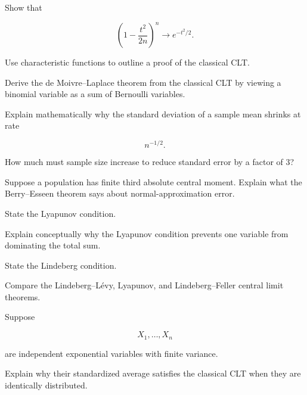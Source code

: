 \begin{exercise}[3]
Show that

\[
\left(
1-\frac{t^2}{2n}
\right)^n
\to
e^{-t^2/2}.
\]
\end{exercise}

\begin{exercise}[3]
Use characteristic functions to outline a proof of the classical CLT.
\end{exercise}

\begin{exercise}[3]
Derive the de Moivre--Laplace theorem from the classical CLT by viewing
a binomial variable as a sum of Bernoulli variables.
\end{exercise}

\begin{exercise}[3]
Explain mathematically why the standard deviation of a sample mean
shrinks at rate

\[
n^{-1/2}.
\]
\end{exercise}

\begin{exercise}[3]
How much must sample size increase to reduce standard error by a factor
of \(3\)?
\end{exercise}

\begin{exercise}[3]
Suppose a population has finite third absolute central moment. Explain
what the Berry--Esseen theorem says about normal-approximation error.
\end{exercise}

\begin{exercise}[3]
State the Lyapunov condition.
\end{exercise}

\begin{exercise}[3]
Explain conceptually why the Lyapunov condition prevents one variable
from dominating the total sum.
\end{exercise}

\begin{exercise}[3]
State the Lindeberg condition.
\end{exercise}

\begin{exercise}[3]
Compare the Lindeberg--Lévy, Lyapunov, and Lindeberg--Feller central
limit theorems.
\end{exercise}

\begin{exercise}[3]
Suppose

\[
X_1,\ldots,X_n
\]

are independent exponential variables with finite variance.

Explain why their standardized average satisfies the classical CLT when
they are identically distributed.
\end{exercise}

